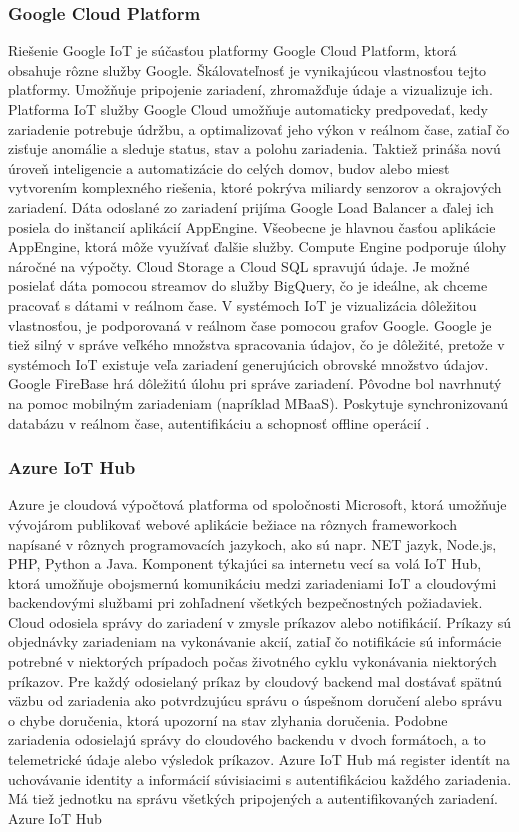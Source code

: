 \documentclass[twoside]{ctuthesis}
\theoremstyle{plain}
\theoremstyle{definition}
\theoremstyle{note}
\begin{document}
\subsubsection{Google Cloud Platform } 
Riešenie Google IoT je súčasťou platformy Google Cloud Platform, ktorá obsahuje rôzne služby Google. Škálovateľnosť je vynikajúcou vlastnosťou tejto platformy. Umožňuje pripojenie zariadení, zhromažďuje údaje a vizualizuje ich. Platforma IoT služby Google Cloud umožňuje automaticky predpovedať, kedy zariadenie potrebuje údržbu, a optimalizovať jeho výkon v reálnom čase, zatiaľ čo zisťuje anomálie a sleduje status, stav a polohu zariadenia. Taktiež prináša novú úroveň inteligencie a automatizácie do celých domov, budov alebo miest vytvorením komplexného riešenia, ktoré pokrýva miliardy senzorov a okrajových zariadení.
Dáta odoslané zo zariadení prijíma Google Load Balancer a ďalej ich posiela do inštancií aplikácií AppEngine. Všeobecne je hlavnou časťou aplikácie AppEngine, ktorá môže využívať ďalšie služby. Compute Engine podporuje úlohy náročné na výpočty. Cloud Storage a Cloud SQL spravujú údaje. Je možné posielať dáta pomocou streamov do služby BigQuery, čo je ideálne, ak chceme pracovať s dátami v reálnom čase. V systémoch IoT je vizualizácia dôležitou vlastnosťou, je podporovaná v reálnom čase pomocou grafov Google. Google je tiež silný v správe veľkého množstva spracovania údajov, čo je dôležité, pretože v systémoch IoT existuje veľa zariadení generujúcich obrovské množstvo údajov. Google FireBase hrá dôležitú úlohu pri správe zariadení. Pôvodne bol navrhnutý na pomoc mobilným zariadeniam (napríklad MBaaS). Poskytuje synchronizovanú databázu v reálnom čase, autentifikáciu a schopnosť offline operácií  \cite{iotcloud} \cite{google}.

\subsubsection{Azure IoT Hub } 
Azure je cloudová výpočtová platforma od spoločnosti Microsoft, ktorá umožňuje vývojárom publikovať webové aplikácie bežiace na rôznych frameworkoch napísané v rôznych programovacích jazykoch, ako sú napr. NET jazyk, Node.js, PHP, Python a Java. Komponent týkajúci sa internetu vecí sa volá IoT Hub, ktorá umožňuje obojsmernú komunikáciu medzi zariadeniami IoT a cloudovými backendovými službami pri zohľadnení všetkých bezpečnostných požiadaviek. Cloud odosiela správy do zariadení v zmysle príkazov alebo notifikácií. Príkazy sú objednávky zariadeniam na vykonávanie akcií, zatiaľ čo notifikácie sú informácie potrebné v niektorých prípadoch počas životného cyklu vykonávania niektorých príkazov. Pre každý odosielaný príkaz by cloudový backend mal dostávať spätnú väzbu od zariadenia ako potvrdzujúcu správu o úspešnom doručení alebo správu o chybe doručenia, ktorá upozorní na stav zlyhania doručenia. Podobne zariadenia odosielajú správy do cloudového backendu v dvoch formátoch, a to telemetrické údaje alebo výsledok príkazov. Azure IoT Hub má register identít na uchovávanie identity a informácií súvisiacimi s autentifikáciou každého zariadenia. Má tiež jednotku na správu všetkých pripojených a autentifikovaných zariadení. Azure IoT Hub 
\newline
\end{document}
